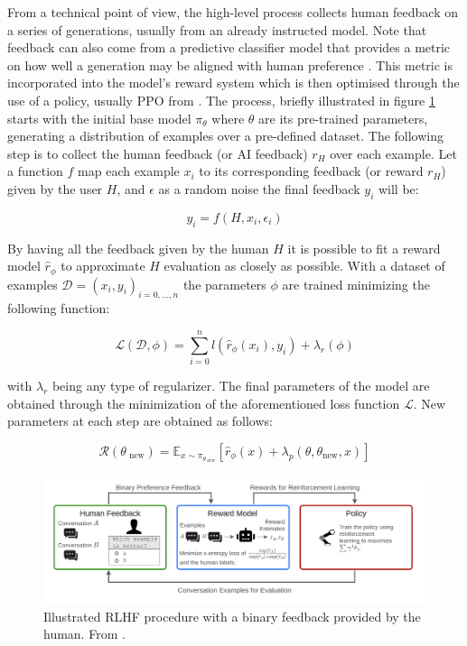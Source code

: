 From a technical point of view, the high-level process collects human feedback on a series of generations, usually from an already instructed model. Note that feedback can also come from a predictive classifier model that provides a metric on how well a generation may be aligned with human preference \citep{lee2023rlaif}. This metric is incorporated into the model's reward system which is then optimised through the use of a policy, usually PPO from \citet{schulman2017proximal}. The process, briefly illustrated in figure \ref{fig:rlhf-procedure} starts with the initial base model $\pi_{\theta}$ where $\theta$ are its pre-trained parameters, generating a distribution of examples over a pre-defined dataset. The following step is to collect the human feedback (or AI feedback) $r_H$ over each example. Let a function $f$ map each example $x_i$ to its corresponding feedback (or reward $r_H$) given by the user $H$, and $\epsilon$ as a random noise the final feedback $y_i$ will be:

\begin{equation*}
    y_i = f(H, x_i, \epsilon_i)
\end{equation*}

By having all the feedback given by the human $H$ it is possible to fit a reward model $\hat{r}_{\phi}$ to approximate $H$ evaluation as closely as possible. With a dataset of examples $\mathcal{D} = {(x_i, y_i)_{i = 0,...,n}}$ the parameters $\phi$ are trained minimizing the following function:

\begin{equation*}
    \mathcal{L}(\mathcal{D}, \phi) = \sum_{i = 0}^{n} l(\hat{r}_{\phi}(x_i), y_i) + \lambda_r(\phi)
\end{equation*}

with $\lambda_r$ being any type of regularizer. The final parameters of the model are obtained through the minimization of the aforementioned loss function $\mathcal{L}$. New parameters at each step are obtained as follows:

\begin{equation*}
    \mathcal{R}(\theta_{\text{ new}}) = \mathbb{E}_{x \sim \pi_{\theta_{\text{ new}}}} 
        [\hat{r}_{\phi}(x) + \lambda_p (\theta, \theta_{\text{new}}, x) ] 
\end{equation*}

\begin{figure}
    \centering
    \includegraphics[width=0.99\linewidth]{Figs/rlhf-procedure.png}
    \caption{Illustrated RLHF procedure with a binary feedback provided by the human. From \citet{casper2023open}.}
    \label{fig:rlhf-procedure}
\end{figure}


